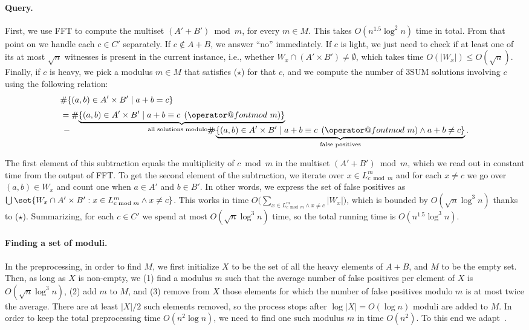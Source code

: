 \documentclass[10pt,a4paper]{article}
\makeatletter
\newcommand{\tpmod}[1]{\mkern 8mu({\operator@font mod}\mkern 6mu#1)}
\makeatother
\begin{document}
\paragraph{Query.}
First, we use FFT to compute the multiset $(A'+B') \bmod m$, for every $m \in M$. This takes $O(n^{1.5} \log^2 n)$ time in total. From that point on we handle each $c \in C'$ separately. If $c \notin A+B$, we answer ``no'' immediately. If $c$ is light, we just need to check if at least one of its at most $\sqrt{n}$ witnesses is present in the current instance, i.e., whether $W_x \cap (A' \times B') \neq \emptyset$, which takes time $O(|W_x|) \leqslant O(\sqrt{n})$. Finally, if $c$ is heavy, we pick a modulus $m \in M$ that satisfies ($\star$) for that $c$, and we compute the number of 3SUM solutions involving $c$ using the following relation:
\begin{align*}
& \# \{(a,b) \in A' \times B' \mid a+b=c\} \\[.3em]
& = \# \smash{\underbrace{\{(a,b) \in A' \times B' \mid a + b \equiv c \tpmod{m}\}}_{\text{all solutions modulo $m$}}} \\[.3em]
&\, - \hspace{16em} \# \underbrace{\{(a,b) \in A' \times B' \mid a + b \equiv c \tpmod{m} \land a + b \neq c\}}_{\text{false positives}}.
\end{align*}

The first element of this subtraction equals the multiplicity of $c \bmod m$ in the multiset $(A'+B') \bmod m$, which we read out in constant time from the output of FFT. To get the second element of the subtraction, we iterate over $x \in L^m_{c \bmod m}$ and for each $x \neq c$ we go over $(a,b) \in W_x$ and count one when $a \in A'$ and $b \in B'$. In other words, we express the set of false positives as 
$\bigcup\set{W_x \cap A' \times B' : x \in L^m_{c \bmod m} \land x \neq c}$. This works in time $O\big(\sum_{x \in L^m_{c \bmod m} \land x \neq c} |W_x|\big)$, which is bounded by $O(\sqrt{n} \log^3 n)$ thanks to ($\star$). Summarizing, for each $c \in C'$ we spend at most $O(\sqrt{n} \log^3 n)$ time, so the total running time is $O(n^{1.5} \log^3 n)$.

\paragraph{Finding a set of moduli.}
In the preprocessing, in order to find $M$, we first initialize $X$ to be the set of all the heavy elements of $A+B$, and $M$ to be the empty set. Then, as long as $X$ is non-empty, we (1) find a modulus $m$ such that the average number of false positives per element of $X$ is $O(\sqrt{n} \log^3 n)$, (2) add $m$ to $M$, and (3) remove from $X$ those elements for which the number of false positives modulo $m$ is at most twice the average. There are at least $|X|/2$ such elements removed, so the process stops after $\log |X| = O(\log n)$ moduli are added to $M$. In order to keep the total preprocessing time $O(n^2 \log n)$, we need to find one such modulus $m$ in time $O(n^2)$. To this end we adapt~\cite[Lemma 11]{FischerK024}.
\end{document}
